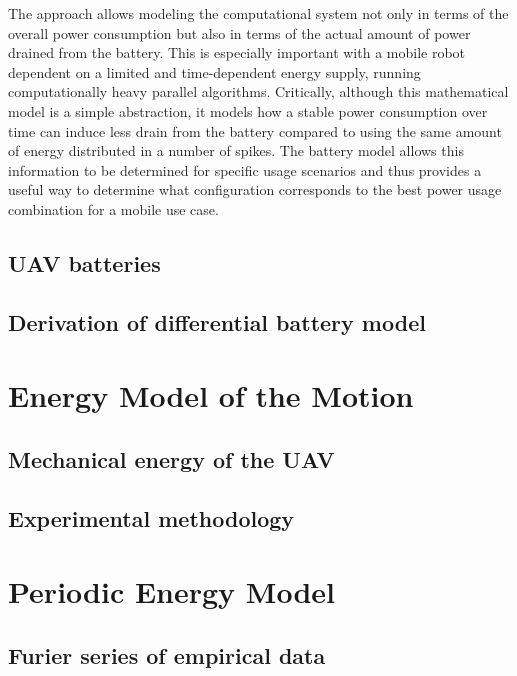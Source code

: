 The approach allows modeling the computational system not only in terms of the overall power consumption but also in terms of the actual amount of power drained from the battery. This is especially important with a mobile robot dependent on a limited and time-dependent energy supply, running computationally heavy parallel algorithms. Critically, although this mathematical model is a simple abstraction, it models how a stable power consumption over time can induce less drain from the battery compared to using the same amount of energy distributed in a number of spikes. The battery model allows this information to be determined for specific usage scenarios and thus provides a useful way to determine what configuration corresponds to the best power usage combination for a mobile use case.


\subsection{\color{red}UAV batteries}

\subsection{\color{red}Derivation of differential battery model}


\section{\color{red}Energy Model of the Motion}

\subsection{\color{red}Mechanical energy of the UAV}

\subsection{\color{red}Experimental methodology}


\section{\color{red}Periodic Energy Model}

\subsection{\color{red}Furier series of empirical data}

